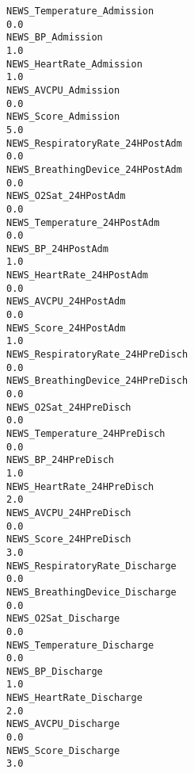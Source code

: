 \documentclass[hf]{ceurart}
\begin{document}
\begin{verbatim}
NEWS_Temperature_Admission                                                        0.0
NEWS_BP_Admission                                                                 1.0
NEWS_HeartRate_Admission                                                          1.0
NEWS_AVCPU_Admission                                                              0.0
NEWS_Score_Admission                                                              5.0
NEWS_RespiratoryRate_24HPostAdm                                                   0.0
NEWS_BreathingDevice_24HPostAdm                                                   0.0
NEWS_O2Sat_24HPostAdm                                                             0.0
NEWS_Temperature_24HPostAdm                                                       0.0
NEWS_BP_24HPostAdm                                                                1.0
NEWS_HeartRate_24HPostAdm                                                         0.0
NEWS_AVCPU_24HPostAdm                                                             0.0
NEWS_Score_24HPostAdm                                                             1.0
NEWS_RespiratoryRate_24HPreDisch                                                  0.0
NEWS_BreathingDevice_24HPreDisch                                                  0.0
NEWS_O2Sat_24HPreDisch                                                            0.0
NEWS_Temperature_24HPreDisch                                                      0.0
NEWS_BP_24HPreDisch                                                               1.0
NEWS_HeartRate_24HPreDisch                                                        2.0
NEWS_AVCPU_24HPreDisch                                                            0.0
NEWS_Score_24HPreDisch                                                            3.0
NEWS_RespiratoryRate_Discharge                                                    0.0
NEWS_BreathingDevice_Discharge                                                    0.0
NEWS_O2Sat_Discharge                                                              0.0
NEWS_Temperature_Discharge                                                        0.0
NEWS_BP_Discharge                                                                 1.0
NEWS_HeartRate_Discharge                                                          2.0
NEWS_AVCPU_Discharge                                                              0.0
NEWS_Score_Discharge                                                              3.0

\end{verbatim}
\end{document}
